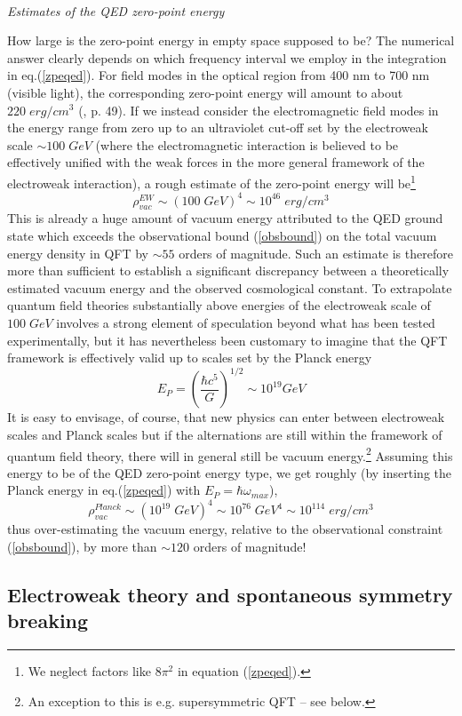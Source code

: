 \documentclass[12pt]{article}
\def\ss{\subsection}
\begin{document}
\ \\
{\em Estimates of the QED zero-point energy}

How large is the zero-point energy in empty space supposed to be? The
numerical answer clearly depends on which frequency interval we
employ in the integration in eq.(\ref{zpeqed}). For field modes in
the optical region from 400 nm to 700 nm (visible light), the
corresponding zero-point energy will amount to about $220 \;
erg/cm^3$ (\cite{milonni94}, p. 49). If we instead consider the
electromagnetic field modes in the energy range from zero up to an
ultraviolet cut-off set by the electroweak scale $\sim 100 \; GeV$
(where the electromagnetic interaction is believed to be
effectively unified with the weak forces in the more general
framework of the electroweak interaction), a rough estimate of the
zero-point energy will be\footnote{We neglect factors like $8
\pi^2$ in equation (\ref{zpeqed}).}
$$
\rho^{EW}_{vac} \sim (100 \; GeV)^4 \sim 
10^{46} \; erg/cm^3
$$
This is already a huge amount of vacuum energy attributed to the
QED ground state which exceeds the observational bound
(\ref{obsbound}) on the total vacuum energy density in QFT by
$\sim 55$ orders of magnitude. Such an estimate is therefore more
than sufficient to establish a significant discrepancy between a
theoretically estimated vacuum energy and the observed
cosmological constant. To extrapolate quantum field theories
substantially above energies of the electroweak scale of $100 \;
GeV$ involves a strong element of speculation beyond what has been
tested experimentally, but it has nevertheless been customary to
imagine that the QFT framework is effectively valid up to scales
set by the Planck energy
$$
E_P = \left(\frac{\hbar c^5}{G} \right)^{1/2} \sim 10^{19} GeV
$$
It is easy to envisage, of course, that new physics can enter
between electroweak scales and Planck scales but if the
alternations are still within the framework of quantum field
theory, there will in general still be vacuum energy.\footnote{An
exception to this is e.g. supersymmetric QFT -- see below.}
Assuming this energy to be of the QED zero-point energy type,
we get roughly (by inserting the Planck energy in eq.(\ref{zpeqed}) 
with $E_P = \hbar \omega_{max}$), 
$$
\rho^{Planck}_{vac} \sim (10^{19} \; GeV)^4 \sim 10^{76} \; GeV^4
\sim 10^{114} \; erg/cm^3
$$
thus over-estimating the vacuum energy, relative to the 
observational constraint (\ref{obsbound}),
by more than $\sim 120$ orders of magnitude!

\ss{Electroweak theory and spontaneous symmetry breaking}
\end{document}
